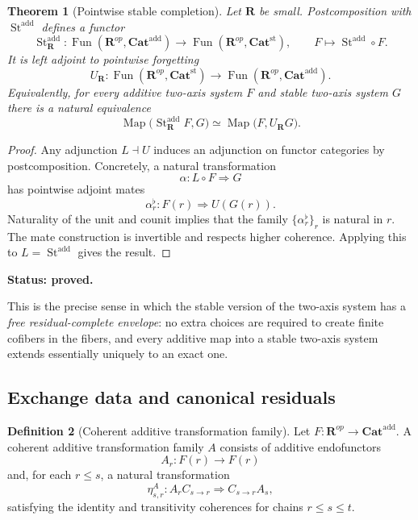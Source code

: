 \documentclass[11pt]{article}
\newtheorem{theorem}{Theorem}[section]
\theoremstyle{definition}
\newtheorem{definition}[theorem]{Definition}
\theoremstyle{remark}
\newcommand{\Rcat}{\mathbf R}
\newcommand{\status}[1]{\textbf{Status: #1.}}
\begin{document}
\begin{theorem}[Pointwise stable completion]\label{thm:pointwise-stable}
Let $\Rcat$ be small. Postcomposition with $\operatorname{St}^{\mathrm{add}}$ defines a functor
\[
\operatorname{St}^{\mathrm{add}}_{\Rcat}:
\operatorname{Fun}(\Rcat^{op},\mathbf{Cat}^{\mathrm{add}})
\longrightarrow
\operatorname{Fun}(\Rcat^{op},\mathbf{Cat}^{\mathrm{st}}),
\qquad
F\longmapsto \operatorname{St}^{\mathrm{add}}\circ F.
\]
It is left adjoint to pointwise forgetting
\[
U_{\Rcat}:
\operatorname{Fun}(\Rcat^{op},\mathbf{Cat}^{\mathrm{st}})
\longrightarrow
\operatorname{Fun}(\Rcat^{op},\mathbf{Cat}^{\mathrm{add}}).
\]
Equivalently, for every additive two-axis system $F$ and stable two-axis system $G$ there is a natural equivalence
\[
\operatorname{Map}
\bigl(\operatorname{St}^{\mathrm{add}}_{\Rcat}F,G\bigr)
\simeq
\operatorname{Map}
\bigl(F,U_{\Rcat}G\bigr).
\]
\end{theorem}

\begin{proof}
Any adjunction $L\dashv U$ induces an adjunction on functor categories by postcomposition. Concretely, a natural transformation
\[
\alpha:L\circ F\Rightarrow G
\]
has pointwise adjoint mates
\[
\alpha_r^{\flat}:F(r)\Rightarrow U(G(r)).
\]
Naturality of the unit and counit implies that the family $\{\alpha_r^{\flat}\}_r$ is natural in $r$. The mate construction is invertible and respects higher coherence. Applying this to $L=\operatorname{St}^{\mathrm{add}}$ gives the result.
\end{proof}

\status{proved}

This is the precise sense in which the stable version of the two-axis system has a \emph{free residual-complete envelope}: no extra choices are required to create finite cofibers in the fibers, and every additive map into a stable two-axis system extends essentially uniquely to an exact one.

\subsection{Exchange data and canonical residuals}

\begin{definition}[Coherent additive transformation family]
Let $F:\Rcat^{op}\to\mathbf{Cat}^{\mathrm{add}}$. A coherent additive transformation family $A$ consists of additive endofunctors
\[
A_r:F(r)\to F(r)
\]
and, for each $r\le s$, a natural transformation
\[
\eta^A_{s,r}:A_rC_{s\to r}\Longrightarrow C_{s\to r}A_s,
\]
satisfying the identity and transitivity coherences for chains $r\le s\le t$.
\end{definition}
\end{document}
